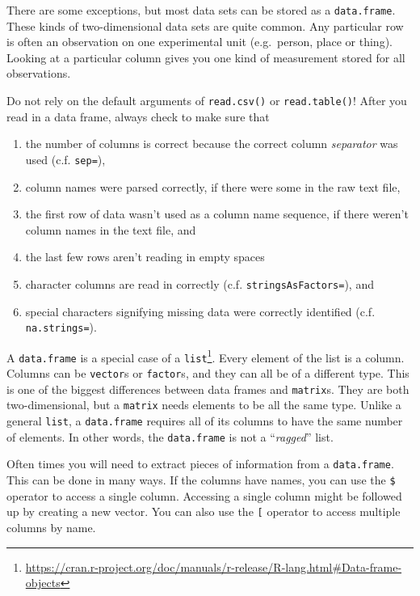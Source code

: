 \documentclass[
  12pt,
  krantz2]{krantz}
\providecommand{\tightlist}{%
  \setlength{\itemsep}{0pt}\setlength{\parskip}{0pt}}
\renewcommand{\href}[2]{#2\footnote{\url{#1}}}
\begin{document}
There are some exceptions, but most data sets can be stored as a \texttt{data.frame}. These kinds of two-dimensional data sets are quite common. Any particular row is often an observation on one experimental unit (e.g.~person, place or thing). Looking at a particular column gives you one kind of measurement stored for all observations.

Do not rely on the default arguments of \texttt{read.csv()} or \texttt{read.table()}! After you read in a data frame, always check to make sure that

\begin{enumerate}
\def\labelenumi{\arabic{enumi}.}
\tightlist
\item
  the number of columns is correct because the correct column \emph{separator} was used (c.f. \texttt{sep=}),
\item
  column names were parsed correctly, if there were some in the raw text file,
\item
  the first row of data wasn't used as a column name sequence, if there weren't column names in the text file, and
\item
  the last few rows aren't reading in empty spaces
\item
  character columns are read in correctly (c.f. \texttt{stringsAsFactors=}), and
\item
  special characters signifying missing data were correctly identified (c.f. \texttt{na.strings=}).
\end{enumerate}

\href{https://cran.r-project.org/doc/manuals/r-release/R-lang.html\#Data-frame-objects}{A \texttt{data.frame} is a special case of a \texttt{list}}. Every element of the list is a column. Columns can be \texttt{vector}s or \texttt{factor}s, and they can all be of a different type. This is one of the biggest differences between data frames and \texttt{matrix}s. They are both two-dimensional, but a \texttt{matrix} needs elements to be all the same type. Unlike a general \texttt{list}, a \texttt{data.frame} requires all of its columns to have the same number of elements. In other words, the \texttt{data.frame} is not a ``\emph{ragged}'' list.

Often times you will need to extract pieces of information from a \texttt{data.frame}. This can be done in many ways. If the columns have names, you can use the \texttt{\$} operator to access a single column. Accessing a single column might be followed up by creating a new vector. You can also use the \texttt{{[}} operator to access multiple columns by name.
\end{document}
